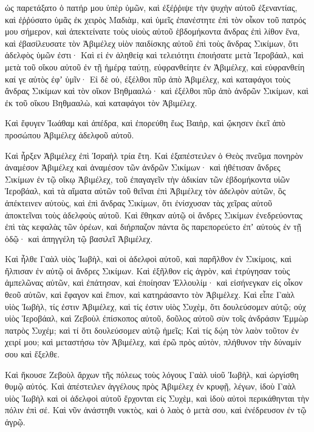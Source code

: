 {ὡς παρετάξατο ὁ πατήρ μου ὑπὲρ ὑμῶν, καὶ ἐξέῤῥιψε τὴν ψυχὴν αὐτοῦ ἐξεναντίας, καὶ ἐῤῥύσατο ὑμᾶς ἐκ χειρὸς Μαδιὰμ,
καὶ ὑμεῖς ἐπανέστητε ἐπὶ τὸν οἶκον τοῦ πατρός μου σήμερον, καὶ ἀπεκτείνατε τοὺς υἱοὺς αὐτοῦ ἑβδομήκοντα ἄνδρας ἐπὶ λίθον ἕνα, καὶ ἐβασίλευσατε τὸν Ἀβιμέλεχ υἱὸν παιδίσκης αὐτοῦ ἐπὶ τοὺς ἄνδρας Σικίμων, ὅτι ἀδελφὸς ὑμῶν ἐστι·
Καὶ εἰ ἐν ἀληθείᾳ καὶ τελειότητι ἐποιήσατε μετὰ Ἱεροβάαλ, καὶ μετὰ τοῦ οἴκου αὐτοῦ ἐν τῇ ἡμέρᾳ ταύτῃ, εὐφρανθείητε ἐν Ἀβιμέλεχ, καὶ εὐφρανθείη καί γε αὐτὸς ἐφʼ ὑμῖν·
Εἰ δὲ οὐ, ἐξέλθοι πῦρ ἀπὸ Ἀβιμέλεχ, καὶ καταφάγοι τοὺς ἄνδρας Σικίμων καὶ τὸν οἴκον Βηθμααλώ· καὶ ἐξέλθοι πῦρ ἀπὸ ἀνδρῶν Σικίμων, καὶ ἐκ τοῦ οἴκου Βηθμααλὼ, καὶ καταφάγοι τὸν Ἀβιμέλεχ.
\par }{\PP {}Καὶ ἔφυγεν Ἰωάθαμ καὶ ἀπέδρα, καὶ ἐπορεύθη ἕως Βαιὴρ, καὶ ᾤκησεν ἐκεῖ ἀπὸ προσώπου Ἀβιμέλεχ ἀδελφοῦ αὐτοῦ.
\par }{\PP {}Καὶ ἦρξεν Ἀβιμέλεχ ἐπὶ Ἰσραὴλ τρία ἔτη.
Καὶ ἐξαπέστειλεν ὁ Θεὸς πνεῦμα πονηρὸν ἀναμέσον Ἀβιμέλεχ καὶ ἀναμέσον τῶν ἀνδρῶν Σικίμων· καὶ ἠθέτισαν ἄνδρες Σικίμων ἐν τῷ οἴκῳ Ἀβιμέλεχ,
τοῦ ἐπαγαγεῖν τὴν ἀδικίαν τῶν ἑβδομήκοντα υἱῶν Ἱεροβάαλ, καὶ τὰ αἵματα αὐτῶν τοῦ θεῖναι ἐπὶ Ἀβιμέλεχ τὸν ἀδελφὸν αὐτῶν, ὃς ἀπέκτεινεν αὐτοὺς, καὶ ἐπὶ ἄνδρας Σικίμων, ὅτι ἐνίσχυσαν τὰς χεῖρας αὐτοῦ ἀποκτεῖναι τοὺς ἀδελφοὺς αὐτοῦ.
Καὶ ἔθηκαν αὐτῷ οἱ ἄνδρες Σικίμων ἐνεδρεύοντας ἐπὶ τὰς κεφαλὰς τῶν ὀρέων, καὶ διήρπαζον πάντα ὃς παρεπορεύετο ἐπʼ αὐτοὺς ἐν τῇ ὁδῷ· καὶ ἀπηγγέλη τῷ βασιλεῖ Ἀβιμέλεχ.
\par }{\PP {}Καὶ ἦλθε Γαὰλ υἱὸς Ἰωβὴλ, καὶ οἱ ἀδελφοὶ αὐτοῦ, καὶ παρῆλθον ἐν Σικίμοις, καὶ ἤλπισαν ἐν αὐτῷ οἱ ἄνδρες Σικίμων.
Καὶ ἐξῆλθον εἰς ἀγρὸν, καὶ ἐτρύγησαν τοὺς ἀμπελῶνας αὐτῶν, καὶ ἐπάτησαν, καὶ ἐποίησαν Ἐλλουλίμ· καὶ εἰσήνεγκαν εἰς οἶκον θεοῦ αὐτῶν, καὶ ἔφαγον καὶ ἔπιον, καὶ κατηράσαντο τὸν Ἀβιμέλεχ.
Καὶ εἶπε Γαὰλ υἱὸς Ἰωβὴλ, τίς ἐστιν Ἀβιμέλεχ, καὶ τίς ἐστιν υἱὸς Συχὲμ, ὅτι δουλεύσομεν αὐτῷ; οὐχ υἱὸς Ἱεροβάαλ, καὶ Ζεβοὺλ ἐπίσκοπος αὐτοῦ, δοῦλος αὐτοῦ σὺν τοῖς ἀνδράσιν Ἐμμὼρ πατρὸς Συχέμ; καὶ τί ὅτι δουλεύσομεν αὐτῷ ἡμεῖς;
Καὶ τίς δῴη τὸν λαὸν τοῦτον ἐν χειρί μου; καὶ μεταστήσω τὸν Ἀβιμέλεχ, καὶ ἐρῶ πρὸς αὐτὸν, πλήθυνον τὴν δύναμίν σου καὶ ἔξελθε.
\par }{\PP {}Καὶ ἤκουσε Ζεβοὺλ ἄρχων τῆς πόλεως τοὺς λόγους Γαὰλ υἱοῦ Ἰωβὴλ, καὶ ὠργίσθη θυμῷ αὐτός.
Καὶ ἀπέστειλεν ἀγγέλους πρὸς Ἀβιμέλεχ ἐν κρυφῇ, λέγων, ἰδοὺ Γαὰλ υἱὸς Ἰωβὴλ καὶ οἱ ἀδελφοὶ αὐτοῦ ἔρχονται εἰς Συχὲμ, καὶ ἰδοὺ αὐτοὶ περικάθηνται τὴν πόλιν ἐπὶ σέ.
Καὶ νῦν ἀνάστηθι νυκτὸς, καὶ ὁ λαὸς ὁ μετὰ σου, καὶ ἐνέδρευσον ἐν τῷ ἀγρῷ.
}
